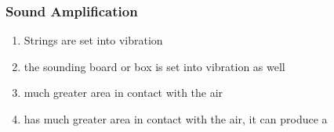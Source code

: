 \documentclass[]{beamer}
\begin{document}

















\begin{frame}
\frametitle{Sound Amplification}


\begin{enumerate}
  \item Strings are set into vibration \pause
  \item  the sounding board or box is set  into vibration as well \pause
  \item  much greater area in contact with the air \pause
  \item  has much greater area in contact with the air, it can
  produce a  \pause
\end{enumerate}




  \end{frame}






\end{document}
